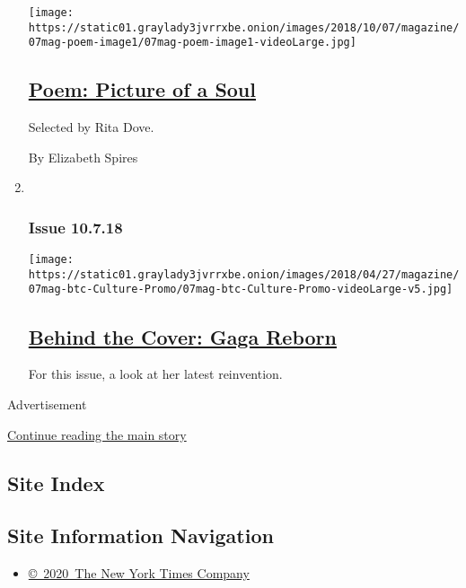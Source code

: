 \begin{enumerate}
  \texttt{[image: https://static01.graylady3jvrrxbe.onion/images/2018/10/07/magazine/07mag-poem-image1/07mag-poem-image1-videoLarge.jpg]}

  \hypertarget{poem-picture-of-a-soul}{%
  \subsection{\texorpdfstring{\href{/2018/10/05/magazine/poem-picture-of-a-soul.html}{Poem:
  Picture of a
  Soul}}{Poem: Picture of a Soul}}\label{poem-picture-of-a-soul}}

  Selected by Rita Dove.

  By Elizabeth Spires
\item ~
  \hypertarget{issue-10718}{%
  \subsubsection{Issue 10.7.18}\label{issue-10718}}

  \texttt{[image: https://static01.graylady3jvrrxbe.onion/images/2018/04/27/magazine/07mag-btc-Culture-Promo/07mag-btc-Culture-Promo-videoLarge-v5.jpg]}

  \hypertarget{behind-the-cover-gaga-reborn}{%
  \subsection{\texorpdfstring{\href{/2018/10/03/magazine/behind-the-cover-gaga-reborn.html}{Behind
  the Cover: Gaga
  Reborn}}{Behind the Cover: Gaga Reborn}}\label{behind-the-cover-gaga-reborn}}

  For this issue, a look at her latest reinvention.
\end{enumerate}

Advertisement

\protect\hyperlink{after-mid1}{Continue reading the main story}

\hypertarget{site-index}{%
\subsection{Site Index}\label{site-index}}

\hypertarget{site-information-navigation}{%
\subsection{Site Information
Navigation}\label{site-information-navigation}}

\begin{itemize}
\tightlist
\item
  \href{https://help.nytimes3xbfgragh.onion/hc/en-us/articles/115014792127-Copyright-notice}{©~2020~The
  New York Times Company}
\end{itemize}

